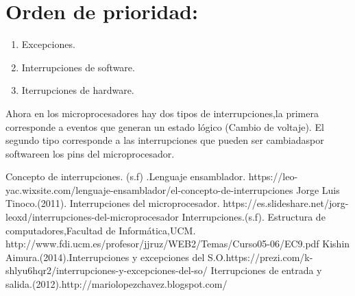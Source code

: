 \documentclass{report}   %
\begin{document}
\section*{Orden de prioridad:}
\begin{enumerate}
    \item Excepciones.
    \item Interrupciones de software.
    \item Iterrupciones de hardware.
\end{enumerate}
Ahora en los microprocesadores hay dos tipos de interrupciones,la primera corresponde a eventos que generan un estado lógico (Cambio de voltaje). El segundo tipo corresponde a las interrupciones que pueden ser cambiadaspor softwareen los pins del microprocesador.


\begin{thebibliography}{0}
  Concepto de interrupciones. (s.f) .Lenguaje ensamblador.
  https://leo-yac.wixsite.com/lenguaje-ensamblador/el-concepto-de-interrupciones
   Jorge Luis Tinoco.(2011). Interrupciones del microprocesador. https://es.slideshare.net/jorg-leoxd/interrupciones-del-microprocesador
   Interrupciones.(s.f). Estructura de computadores,Facultad de Informática,UCM. http://www.fdi.ucm.es/profesor/jjruz/WEB2/Temas/Curso05-06/EC9.pdf
  Kishin Aimura.(2014).Interrupciones y excepciones del S.O.https://prezi.com/k-shlyu6hqr2/interrupciones-y-excepciones-del-so/ Iterrupciones de entrada y salida.(2012).http://mariolopezchavez.blogspot.com/
\end{thebibliography}
\end{document}
